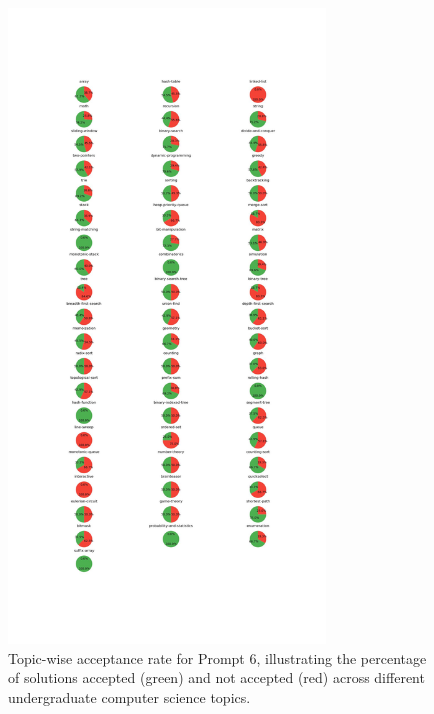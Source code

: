 \begin{figure}[H]
    \centering
    \includegraphics[width=0.75\textwidth, height=0.7\textheight]{figures/6/accepted_not_topicwise.jpg}
    \caption{Topic-wise acceptance rate for Prompt 6, illustrating the percentage of solutions accepted (green) and not accepted (red) across different undergraduate computer science topics.}
    \label{fig:topic_wise_acceptance_prompt_6}
\end{figure}

